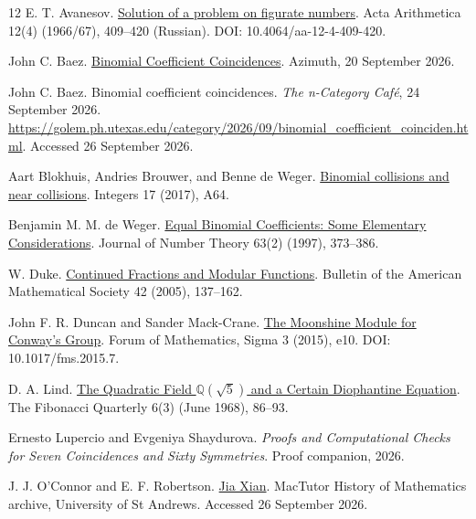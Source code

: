 \documentclass[11pt,a4paper]{article}
\begin{document}
\FloatBarrier
\clearpage
\begin{thebibliography}{12}
\small
\setlength{\itemsep}{0.20em}
E. T. Avanesov. \href{https://eudml.org/doc/204811}{Solution of a problem on figurate numbers}. Acta Arithmetica 12(4) (1966/67), 409--420 (Russian). DOI: 10.4064/aa-12-4-409-420.

John C. Baez. \href{https://johncarlosbaez.wordpress.com/2026/09/20/binomial-coefficient-coincidences/}{Binomial Coefficient Coincidences}. Azimuth, 20 September 2026.

John C. Baez.
\newblock Binomial coefficient coincidences.
\newblock \emph{The n-Category Caf\'e}, 24 September 2026.
\newblock \url{https://golem.ph.utexas.edu/category/2026/09/binomial_coefficient_coinciden.html}.
\newblock Accessed 26 September 2026.

Aart Blokhuis, Andries Brouwer, and Benne de Weger. \href{https://math.colgate.edu/~integers/r64/r64.pdf}{Binomial collisions and near collisions}. Integers 17 (2017), A64.

Benjamin M. M. de Weger. \href{https://math.deweger.net/papers/%5B20%5DdW-EqBinom-JNumTh%5B1997%5D.pdf}{Equal Binomial Coefficients: Some Elementary Considerations}. Journal of Number Theory 63(2) (1997), 373--386.

W. Duke. \href{https://doi.org/10.1090/S0273-0979-05-01047-5}{Continued Fractions and Modular Functions}. Bulletin of the American Mathematical Society 42 (2005), 137--162.

John F. R. Duncan and Sander Mack-Crane. \href{https://doi.org/10.1017/fms.2015.7}{The Moonshine Module for Conway's Group}. Forum of Mathematics, Sigma 3 (2015), e10. DOI: 10.1017/fms.2015.7.

D. A. Lind. \href{https://www.fq.math.ca/Scanned/6-3/lind.pdf}{The Quadratic Field $\mathbb Q(\sqrt5)$ and a Certain Diophantine Equation}. The Fibonacci Quarterly 6(3) (June 1968), 86--93.

Ernesto Lupercio and Evgeniya Shaydurova. \emph{Proofs and Computational Checks for Seven Coincidences and Sixty Symmetries}. Proof companion, 2026.

J. J. O'Connor and E. F. Robertson. \href{https://mathshistory.st-andrews.ac.uk/Biographies/Jia_Xian/}{Jia Xian}. MacTutor History of Mathematics archive, University of St Andrews. Accessed 26 September 2026.


\end{thebibliography}
\end{document}

